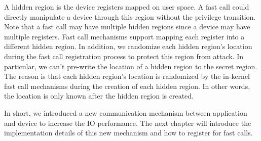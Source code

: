 A hidden region is the device registers mapped on user space. 
A fast call could directly manipulate a device through this region without 
the privilege transition. Note that a fast call may have multiple hidden 
regions since a device may have multiple registers. Fast call mechanisms 
support mapping each register into a different hidden region. In addition,
we randomize each hidden region's location during the fast call registration 
process to protect this region from attack.  In particular, we can't pre-write 
the location of a hidden region to the secret region. The reason is that each hidden 
region's location is randomized by the in-kernel fast call mechanisms during the creation 
of each hidden region. In other words,  the location is only known after the hidden region is created. 

In short, we introduced a new communication mechanism between 
application and device to increase the IO performance. 
The next chapter will introduce the implementation details 
of this new mechanism and how to register for fast calls.
\cleardoublepage

